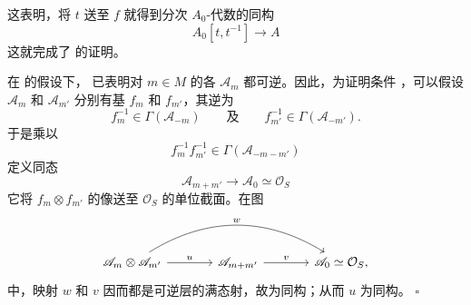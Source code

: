 这表明，将 \(t\) 送至 \(f\) 就得到分次 \(A_0\)-代数的同构
\[
  A_0[t,t^{-1}]\longrightarrow A
\]
这就完成了  的证明。

在  的假设下， 已表明对 \(m\in M\) 的各 \(\mathscr A_m\) 都可逆。因此，为证明条件 ，可以假设 \(\mathscr A_m\) 和 \(\mathscr A_{m'}\) 分别有基 \(f_m\) 和 \(f_{m'}\)，其逆为
\[
  f_m^{-1}\in\Gamma(\mathscr A_{-m})
  \qquad\text{及}\qquad
  f_{m'}^{-1}\in\Gamma(\mathscr A_{-m'}).
\]
于是乘以
\[
  f_m^{-1}f_{m'}^{-1}
  \in\Gamma(\mathscr A_{-m-m'})
\]
定义同态
\[
  \mathscr A_{m+m'}\longrightarrow
  \mathscr A_0\simeq\mathcal O_S
\]
它将 \(f_m\otimes f_{m'}\) 的像送至 \(\mathcal O_S\) 的单位截面。在图
\[
\begin{tikzcd}[column sep=large]
  \mathscr A_m\otimes\mathscr A_{m'}
    \arrow[r,"u"]
    \arrow[rr,bend left=32,"w"]
  & \mathscr A_{m+m'}
    \arrow[r,"v"]
  & \mathscr A_0\simeq\mathcal O_S ,
\end{tikzcd}
\]
中，映射 \(w\) 和 \(v\) 因而都是可逆层的满态射，故为同构；从而 \(u\) 为同构。
\hfill\(\square\)
